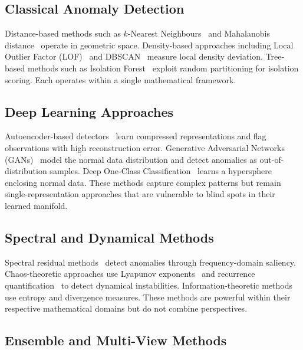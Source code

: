 \documentclass[journal]{IEEEtran}
\begin{document}
\subsection{Classical Anomaly Detection}

Distance-based methods such as $k$-Nearest Neighbours~\cite{ramaswamy2000efficient} and Mahalanobis distance~\cite{de2000mahalanobis} operate in geometric space. Density-based approaches including Local Outlier Factor (LOF)~\cite{breunig2000lof} and DBSCAN~\cite{ester1996density} measure local density deviation. Tree-based methods such as Isolation Forest~\cite{liu2008isolation} exploit random partitioning for isolation scoring. Each operates within a single mathematical framework.

\subsection{Deep Learning Approaches}

Autoencoder-based detectors~\cite{an2015variational,zhou2017anomaly} learn compressed representations and flag observations with high reconstruction error. Generative Adversarial Networks (GANs)~\cite{schlegl2017unsupervised} model the normal data distribution and detect anomalies as out-of-distribution samples. Deep One-Class Classification~\cite{ruff2018deep} learns a hypersphere enclosing normal data. These methods capture complex patterns but remain single-representation approaches that are vulnerable to blind spots in their learned manifold.

\subsection{Spectral and Dynamical Methods}

Spectral residual methods~\cite{ren2019time} detect anomalies through frequency-domain saliency. Chaos-theoretic approaches use Lyapunov exponents~\cite{rosenstein1993practical} and recurrence quantification~\cite{marwan2007recurrence} to detect dynamical instabilities. Information-theoretic methods~\cite{lee2001information} use entropy and divergence measures. These methods are powerful within their respective mathematical domains but do not combine perspectives.

\subsection{Ensemble and Multi-View Methods}
\end{document}

